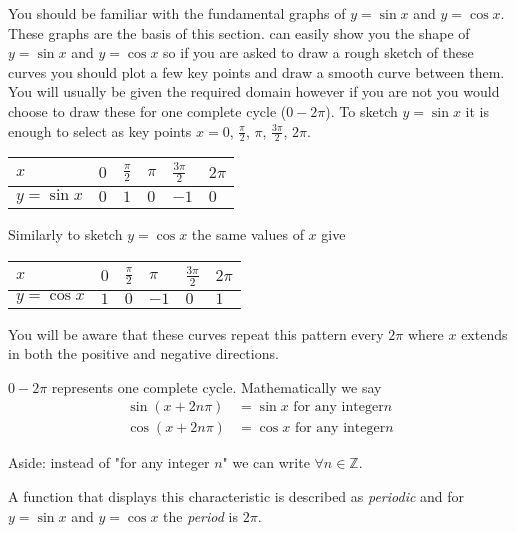 You should be familiar with the fundamental graphs of $y =\sin  x$ and $y =\cos  x$. These graphs are the basis of this section. \Desmos can easily show you the shape of $y =\sin  x$ and $y =\cos  x$ so if you are asked to draw a rough sketch of these curves you should plot a few key points and draw a smooth curve between them. You will usually be given the required domain however if you are not you would choose to draw these for one complete cycle ($0 -2 \pi $). To sketch $y =\sin  x$ it is enough to select as key points $x =0$, $\frac{\pi }{2}$, $\pi $, $\frac{3 \pi }{2}$, $2 \pi $. 


\begin{tabular}[c]{|l|l|l|l|l|l|}\hline
	$x$  & $0$  & $\frac{\pi }{2}$  & $\pi $  & $\frac{3 \pi }{2}$  & $2 \pi $  \\
	\hline
	$y =\sin  x$  & $0$  & $1$  & $0$  & $ -1$  & $0$  \\
	\hline
\end{tabular}

Similarly to sketch $y =\cos x$ the same values of $x$ give 


\begin{tabular}[c]{|l|l|l|l|l|l|}\hline
	$x$  & $0$  & $\frac{\pi }{2}$  & $\pi $  & $\frac{3 \pi }{2}$  & $2 \pi $  \\
	\hline
	$y =\cos  x$  & $1$  & $0$  & $ -1$  & $0$  & $1$  \\
	\hline
\end{tabular}

You will be aware that these curves repeat this pattern every $2 \pi $ where $x$ extends in both the positive and negative directions. 

$0 -2 \pi $ represents one complete cycle. Mathematically we say
\begin{align*}\sin  \left (x +2 n \pi \right ) &  = \sin  x\text{\  for any integer}n \\
	\cos  \left (x +2 n \pi \right ) &  = \cos  x\text{\  for any integer}n\end{align*}

Aside: instead of "for any integer $n$" we can write $ \forall n \in \mathbb{Z}$. 

A function that displays this characteristic is described as \emph{periodic} and for $y =\sin x$ and $y =\cos x$ the \emph{period} is $2 \pi $. 

